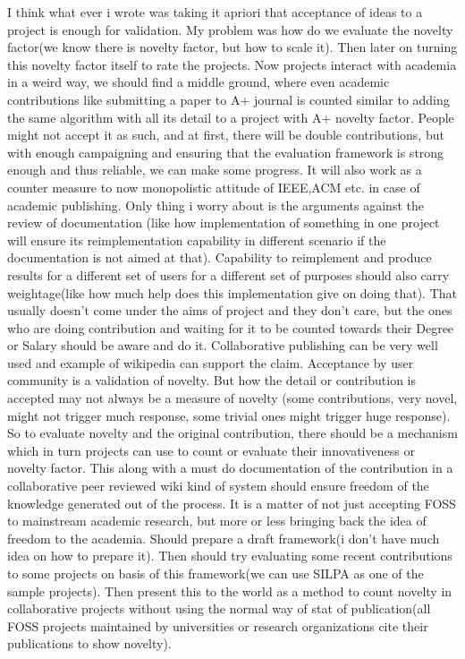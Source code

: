I think what ever i wrote was taking it apriori that acceptance of ideas
to a project is enough for validation. My problem was how do we evaluate
the novelty factor(we know there is novelty factor, but how to scale it).
Then later on turning this novelty factor itself to rate the projects.
Now projects interact with academia in a weird way, we should find a middle
ground, where even academic contributions like submitting a paper to A+
journal is counted similar to adding the same algorithm with all its detail
to a project with A+ novelty factor. People might not accept it as such,
and at first, there will be double contributions, but with enough campaigning
and ensuring that the evaluation framework is strong enough and thus reliable,
we can make some progress. It will also work as a counter measure to now
monopolistic attitude of IEEE,ACM etc. in case of academic publishing.
Only thing i worry about is the arguments against the review of documentation
(like how implementation of something in one project will ensure its
reimplementation capability in different scenario if the documentation
is not aimed at that). Capability to reimplement and produce results for
a different set of users for a different set of purposes should also carry
weightage(like how much help does this implementation give on doing that).
That usually doesn't come under the aims of project and they don't care,
but the ones who are doing contribution and waiting for it to be counted
towards their Degree or Salary should be aware and do it. Collaborative
publishing can be very well used and example of wikipedia can support the claim.
Acceptance by user community is a validation of novelty. But how the detail
or contribution is accepted may not always be a measure of novelty
(some contributions, very novel, might not trigger much response, some
trivial ones might trigger huge response). So to evaluate novelty and the
original contribution, there should be a mechanism which in turn projects
can use to count or evaluate their innovativeness or novelty factor.
This along with a must do documentation of the contribution in a collaborative
peer reviewed wiki kind of system should ensure freedom of the knowledge
generated out of the process. It is a matter of not just accepting FOSS to
mainstream academic research, but more or less bringing back the idea of
freedom to the academia.  Should prepare a draft framework(i don't have
much idea on how to prepare it). Then should try evaluating some recent
contributions to some projects on basis of this framework(we can use SILPA
as one of the sample projects). Then present this to the world as a method
to count novelty in collaborative projects without using the normal way of
stat of publication(all FOSS projects maintained by universities or research
organizations cite their publications to show novelty).
\newpage
